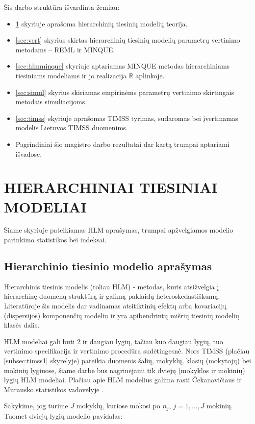 \documentclass[12pt,a4paper]{article}
\newcommand{\R}{{\mathbb R}}
\begin{document}
\indent Šis darbo struktūra išvardinta žemiau:
\begin{itemize}
\item \ref{sec:hlm} skyriuje aprašoma hierarchinių tiesinių modelių teorija.
\item \ref{sec:vert} skyrius skirtas hierarchinių tiesinių modelių parametrų vertinimo metodams -- REML ir MINQUE.
\item \ref{sec:hlmminque} skyriuje aptariamas MINQUE metodas hierarchiniams tiesiniams modeliams ir jo realizacija $\R$ aplinkoje.
\item \ref{sec:simul} skyrius skiriamas empirinėms parametrų vertinimo skirtingais metodais simuliacijoms.
\item \ref{sec:timss} skyriuje aprašomas TIMSS tyrimas, sudaromas bei įvertinamas modelis Lietuvos TIMSS duomenims.
\item Pagrindiniai šio magistro darbo rezultatai dar kartą trumpai aptariami išvadose.
\end{itemize}

\newpage
\section{HIERARCHINIAI TIESINIAI MODELIAI} \label{sec:hlm}
\indent Šiame skyriuje pateikiamas HLM aprašymas, trumpai apžvelgiamos modelio parinkimo statistikos bei indeksai.

\subsection{Hierarchinio tiesinio modelio aprašymas}
\indent Hierarchinis tiesinis modelis (toliau HLM) - metodas, kuris atsižvelgia į hierarchinę duomenų struktūrą ir galimą paklaidų heteroskedastiškumą. Literatūroje šis modelis dar vadinamas atsitiktinių efektų arba kovariacijų (dispersijos) komponenčių modeliu ir yra apibendrintų mišrių tiesinių modelių klasės dalis\cite{hlmmixed}.

\indent HLM modeliai gali būti 2 ir daugiau lygių, tačiau kuo daugiau lygių, tuo vertinimo specifikacija ir vertinimo procedūra sudėtingesnė. Nors TIMSS (plačiau \ref{subsec:timss1} skyrelyje) pateikia duomenis šalių, mokyklų, klasių (mokytojų) bei mokinių lygiuose, šiame darbe bus nagrinėjami tik dviejų (mokyklos ir mokinių) lygių HLM modeliai. Plačiau apie HLM modelius galima rasti Čekanavičiaus ir Murausko statistikos vadovėlyje \cite{cek}.

\indent Sakykime, jog turime $J$ mokyklų, kuriose mokosi po $n_j$, $j = 1,\dots,J$ mokinių. Tuomet dviejų lygių modelio pavidalas:
\end{document}
